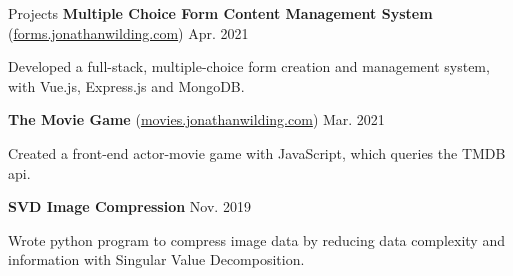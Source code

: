 \documentclass{resume} %
\begin{document}
\begin{rSection}{Projects}
    \textbf{Multiple Choice Form Content Management System}
    (\href{https://forms.jonathanwilding.com}{forms.jonathanwilding.com}) \hfill{Apr. 2021}
    \begin{compactitem}
        \item Developed a full-stack, multiple-choice form creation and management system, with
            Vue.js, Express.js and MongoDB.
    \end{compactitem}
    \textbf{The Movie Game} (\href{https://movies.jonathanwilding.com}{movies.jonathanwilding.com}) \hfill{Mar. 2021}
    \begin{compactitem}
        \item Created a front-end actor-movie game with JavaScript, which queries the TMDB api.
    \end{compactitem}
    \textbf{SVD Image Compression} \hfill{Nov. 2019}
    \begin{compactitem}
        \item Wrote python program to compress image data by reducing data complexity and
            information with Singular Value Decomposition.
    \end{compactitem}
\end{rSection}
\end{document}
